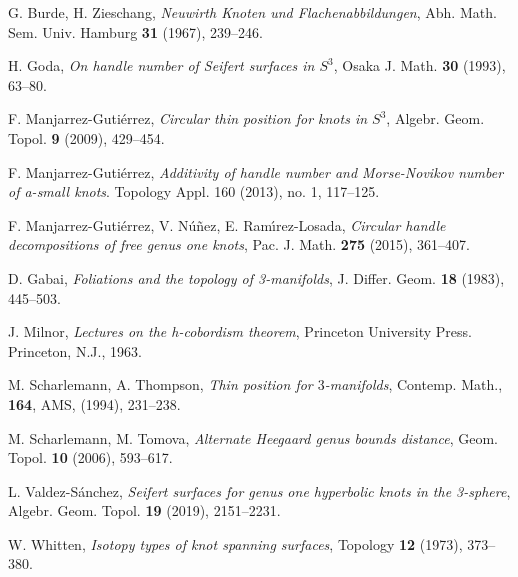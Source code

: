 \documentclass[12pt]{amsart}
\begin{document}
\begin{thebibliography}{99}

 G. Burde, H. Zieschang, \emph{Neuwirth Knoten und Flachenabbildungen}, Abh. Math. Sem. Univ. Hamburg \textbf{31} (1967), 239--246.

 H. Goda, \emph{On handle number of Seifert surfaces in $S^3$}, Osaka J. Math. \textbf{30} (1993), 63--80.

 F. Manjarrez-Guti\'errez, \textit{Circular thin position for knots in $S^3$},
Algebr. Geom. Topol. \textbf{9} (2009), 429--454.

 F. Manjarrez-Guti\'errez, \textit{Additivity of handle number and Morse-Novikov number of a-small knots}. 
Topology Appl. 160 (2013), no. 1, 117--125. 

 F. Manjarrez-Gutiérrez, V. N\'u\~nez, E. Ram\'{\i}rez-Losada, \textit{
Circular handle decompositions of free genus one knots}, 
Pac. J. Math. \textbf{275} (2015), 361--407.

 D. Gabai,
\textit{Foliations and the topology of 3-manifolds}, J. Differ. Geom. \textbf{18} (1983), 445--503. 

 J. Milnor, \textit{Lectures on the h-cobordism theorem}, Princeton University Press. Princeton, N.J., 1963.

 M. Scharlemann, A. Thompson, \textit{Thin position for $3$-manifolds}, Contemp. Math., \textbf{164}, AMS, (1994), 231--238.

 M. Scharlemann, M. Tomova, \textit{Alternate Heegaard genus bounds distance}, Geom. Topol. \textbf{10} (2006), 593--617.

 L. Valdez-S\'anchez, 
\textit{Seifert surfaces for genus one hyperbolic knots in the 3-sphere},
Algebr. Geom. Topol. \textbf{19} (2019), 2151--2231.

 W. Whitten, \emph{Isotopy types of knot spanning surfaces}, Topology \textbf{12} (1973), 373--380.


\end{thebibliography}
\end{document}
